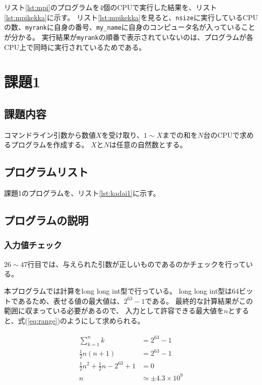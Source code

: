 \documentclass[a4j,titlepage]{jsarticle}
\begin{document}


リスト\ref{lst:mpi}のプログラムを4個のCPUで実行した結果を、リスト\ref{lst:mpikekka}に示す。
リスト\ref{lst:mpikekka}を見ると、\texttt{nsize}に実行しているCPUの数、\texttt{myrank}に自身の番号、\texttt{my\_name}に自身のコンピュータ名が入っていることが分かる。
実行結果が\texttt{myrank}の順番で表示されていないのは、プログラムが各CPU上で同時に実行されているためである。




\section{課題1}
\subsection{課題内容}
コマンドライン引数から数値$X$を受け取り、$1 \sim X$までの和を$N$台のCPUで求めるプログラムを作成する。
$X$と$N$は任意の自然数とする。

\subsection{プログラムリスト}
課題1のプログラムを、リスト\ref{lst:kadai1}に示す。



\subsection{プログラムの説明}
\subsubsection{入力値チェック}
$26 \sim 47$行目では、与えられた引数が正しいものであるのかチェックを行っている。

本プログラムでは計算をlong long int型で行っている。
long long int型は64ビットであるため、表せる値の最大値は、$2^{63} - 1$である。
最終的な計算結果がこの範囲に収まっている必要があるので、
入力として許容できる最大値を$n$とすると、式(\ref{eq:range})のようにして求められる。

\begin{align}
  \begin{aligned}
    \sum^{n}_{k = 1} k &= 2^{63} - 1 \\
    \frac{1}{2} n (n + 1) &= 2^{63} - 1 \\
    \frac{1}{2} n^2 + \frac{1}{2} n - 2^{63} + 1 &= 0 \\
    n &\simeq \pm 4.3 \times 10^9
    \label{eq:range}
  \end{aligned}
\end{align}
\end{document}
